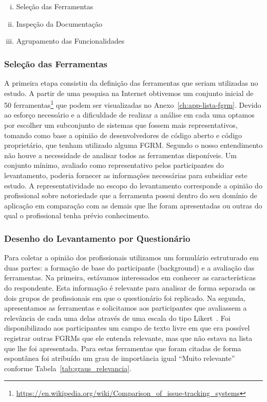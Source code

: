 \begin{enumerate}[(i)]
	\item Seleção das Ferramentas
	\item Inspeção da Documentação
	\item Agrupamento das Funcionalidades
\end{enumerate}

\subsubsection{Seleção das Ferramentas}
\label{subsubsec:selecao-ferramentas}

A primeira etapa consistiu da definição das ferramentas que seriam utilizadas no
estudo. A partir de uma pesquisa na Internet obtivemos um conjunto inicial de 50
ferramentas\footnote{\url{https://en.wikipedia.org/wiki/Comparison_of_issue-tracking_systems}}
que podem ser visualizadas no Anexo~\ref{ch:app-lista-fgrm}. Devido ao esforço
necessário e a dificuldade de realizar a análise em cada uma optamos por
escolher um subconjunto de sistemas que fossem mais representativos, tomando
como base a opinião de desenvolvedores de código aberto e código proprietário,
que tenham utilizado alguma FGRM\@. Segundo o nosso entendimento não houve a
necessidade de analisar todos as ferramentas disponíveis. Um conjunto mínimo,
avaliado como representativo pelos participantes do levantamento, poderia
fornecer as informações necessárias para subsidiar este estudo. A
representatividade no escopo do levantamento corresponde a opinião do
profissional sobre notoriedade que a ferramenta possui dentro do seu domínio de
aplicação em comparação com as demais que lhe foram apresentadas ou outras do
qual o profissional tenha prévio conhecimento.

\subsubsection{Desenho do Levantamento por Questionário}
\label{ssub:metodologia_desenho_da_pesquisa_com_profissionais}

Para coletar a opinião dos profissionais utilizamos um formulário estruturado em
duas partes: a formação de base do participante (background) e a avaliação das
ferramentas. Na primeira, estávamos interessados em conhecer as características
do respondente. Esta informação é relevante para analisar de forma separada os
dois grupos de profissionais em que o questionário foi replicado. Na segunda,
apresentamos as ferramentas e solicitamos aos participantes que avaliassem a
relevância de cada uma delas através de uma escala do tipo
Likert~\cite{robbins2011plotting}. Foi disponibilizado aos participantes um
campo de texto livre em que era possível registrar outras FGRMs que ele entenda
relevante, mas que não estava na lista que lhe foi apresentada. Para estas
ferramentas que foram citadas de forma espontânea foi atribuído um grau de
importância igual ``Muito relevante'' conforme
Tabela~\ref{tab:graus_relevancia}.

